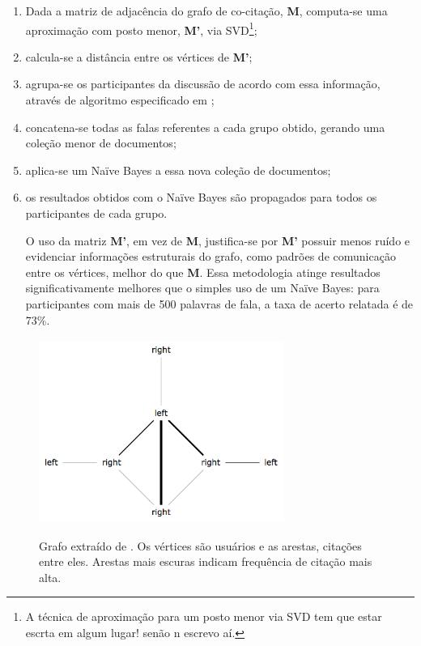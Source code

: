 \begin{enumerate}
  \item Dada a matriz de adjacência do grafo de co-citação, \textbf{M}, computa-se uma aproximação com posto menor, \textbf{M'}, via SVD\footnote{A técnica de aproximação para um posto menor via SVD tem que estar escrta em algum lugar! senão n escrevo aí.};
  \item calcula-se a distância entre os vértices de \textbf{M'};
  \item agrupa-se os participantes da discussão de acordo com essa informação, através de algoritmo especificado em \cite{hoon};
  \item concatena-se todas as falas referentes a cada grupo obtido, gerando uma coleção menor de documentos;
  \item aplica-se um Naïve Bayes a essa nova coleção de documentos;
  \item os resultados obtidos com o Naïve Bayes são propagados para todos os participantes de cada grupo.

O uso da matriz \textbf{M'}, em vez de \textbf{M}, justifica-se por \textbf{M'} possuir menos ruído e evidenciar informações estruturais do grafo, como padrões de comunicação entre os vértices, melhor do que \textbf{M}\cite{drineas}. Essa metodologia atinge resultados significativamente melhores que o simples uso de um Naïve Bayes: para participantes com mais de 500 palavras de fala, a taxa de acerto relatada é de 73\%.
\end{enumerate}

\begin{figure}[h]
  \centering %
  \includegraphics[width=8cm, height=6cm]{taking-sides-graph.png}\\
  \caption{Grafo extraído de \cite{malouf-taking_sides}. Os vértices são usuários e as arestas, citações entre eles. Arestas mais escuras indicam frequência de citação mais alta.}
  \label{fig:malouf}
\end{figure}


